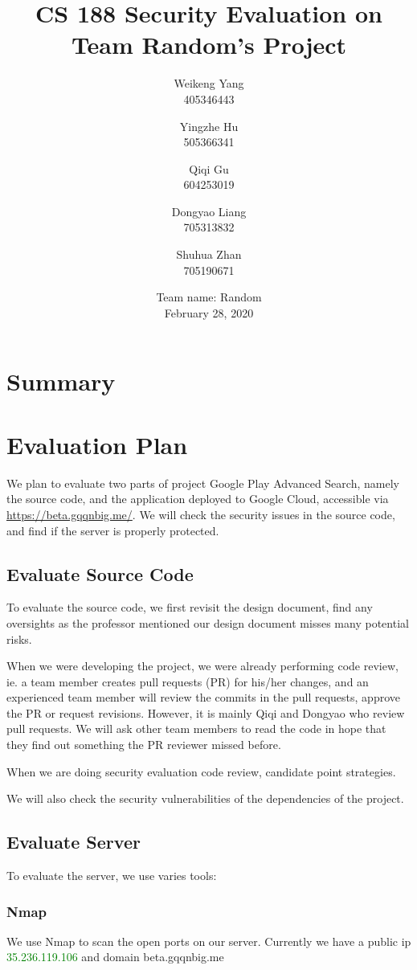 \documentclass[12pt, a4paper]{article}
\title{CS 188 Security Evaluation on Team Random's Project}
\author{Weikeng Yang\\405346443 \and
Yingzhe Hu\\505366341 \and
Qiqi Gu\\604253019 \and
Dongyao Liang\\705313832 \and
Shuhua Zhan\\705190671}
\date{Team name: Random\\[2mm]February 28, 2020}
\begin{document}
\maketitle

\section{Summary}




\section{Evaluation Plan}

We plan to evaluate two parts of project Google Play Advanced Search, namely the source code, and the application deployed to Google Cloud, accessible via \url{https://beta.gqqnbig.me/}. We will check the security issues in the source code, and find if the server is properly protected.

\subsection{Evaluate Source Code}
To evaluate the source code, we first revisit the design document, find any oversights as the professor mentioned our design document misses many potential risks.

When we were developing the project, we were already performing code review, ie. a team member creates pull requests (PR) for his/her changes, and an experienced team member will review the commits in the pull requests, approve the PR or request revisions. However, it is mainly Qiqi and Dongyao who review pull requests. We will ask other team members to read the code in hope that they find out something the PR reviewer missed before.

When we are doing security evaluation code review, candidate point strategies.

We will also check the security vulnerabilities of the dependencies of the project.


\subsection{Evaluate Server}
To evaluate the server, we use varies tools:

\subsubsection{Nmap}
We use Nmap to scan the open ports on our server. Currently we have a public ip \textcolor{green}{35.236.119.106} and domain beta.gqqnbig.me
\end{document}

